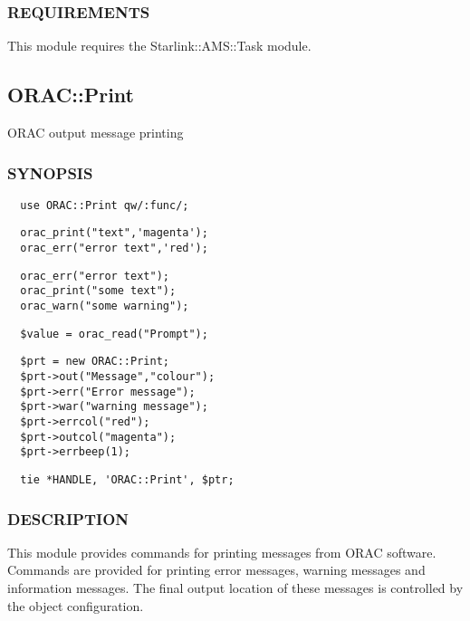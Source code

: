 \subsubsection*{REQUIREMENTS\label{ORAC::Msg::Task::ADAM_REQUIREMENTS}}

This module requires the Starlink::AMS::Task module.



\subsection{ORAC::Print\label{ORAC::Print}}

ORAC output message printing

\subsubsection*{SYNOPSIS\label{ORAC::Print_SYNOPSIS}}\begin{verbatim}
  use ORAC::Print qw/:func/;
\end{verbatim}
\begin{verbatim}
  orac_print("text",'magenta');
  orac_err("error text",'red');
\end{verbatim}
\begin{verbatim}
  orac_err("error text");
  orac_print("some text");
  orac_warn("some warning");
\end{verbatim}
\begin{verbatim}
  $value = orac_read("Prompt");
\end{verbatim}
\begin{verbatim}
  $prt = new ORAC::Print;
  $prt->out("Message","colour");
  $prt->err("Error message"); 
  $prt->war("warning message");
  $prt->errcol("red");
  $prt->outcol("magenta");
  $prt->errbeep(1);
\end{verbatim}
\begin{verbatim}
  tie *HANDLE, 'ORAC::Print', $ptr;
\end{verbatim}
\subsubsection*{DESCRIPTION\label{ORAC::Print_DESCRIPTION}}

This module provides commands for printing messages from ORAC
software. Commands are provided for printing error messages, warning
messages and information messages. The final output location of these
messages is controlled by the object configuration.



